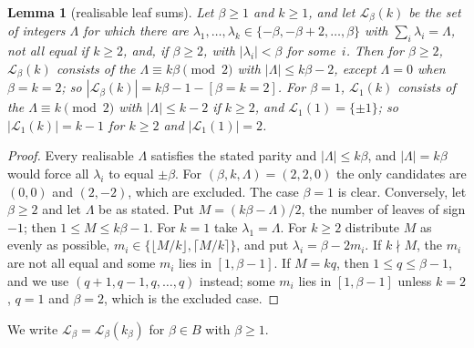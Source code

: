 \documentclass[11pt]{article}
\numberwithin{equation}{section}
\newtheorem{lemma}{Lemma}[section]
\theoremstyle{remark}
\newcommand{\cL}{\mathcal L}
\begin{document}
\begin{lemma}[realisable leaf sums]\label{lem:real}
Let $\beta\ge1$ and $k\ge1$, and let $\cL_\beta(k)$ be the set of integers
$\Lambda$ for which there are $\lambda_1,\dots,\lambda_k\in\{-\beta,-\beta+2,
\dots,\beta\}$ with $\sum_i\lambda_i=\Lambda$, not all equal if $k\ge2$, and,
if $\beta\ge2$, with $|\lambda_i|<\beta$ for some~$i$. Then for $\beta\ge2$,
$\cL_\beta(k)$ consists of the $\Lambda\equiv k\beta\pmod2$ with
$|\Lambda|\le k\beta-2$, except $\Lambda=0$ when $\beta=k=2$; so
$|\cL_\beta(k)|=k\beta-1-[\beta=k=2]$. For $\beta=1$, $\cL_1(k)$ consists of the
$\Lambda\equiv k\pmod 2$ with $|\Lambda|\le k-2$ if $k\ge2$, and
$\cL_1(1)=\{\pm1\}$; so $|\cL_1(k)|=k-1$ for $k\ge2$ and $|\cL_1(1)|=2$.
\end{lemma}
\begin{proof}
Every realisable $\Lambda$ satisfies the stated parity and $|\Lambda|\le
k\beta$, and $|\Lambda|=k\beta$ would force all $\lambda_i$ to equal $\pm\beta$.
For $(\beta,k,\Lambda)=(2,2,0)$ the only candidates are $(0,0)$ and
$(2,-2)$, which are excluded. The case $\beta=1$ is clear. Conversely, let
$\beta\ge2$ and let $\Lambda$ be as stated. Put $M=(k\beta-\Lambda)/2$, the
number of leaves of sign $-1$; then $1\le M\le k\beta-1$. For $k=1$ take
$\lambda_1=\Lambda$. For $k\ge2$ distribute $M$ as evenly as possible, $m_i\in
\{\lfloor M/k\rfloor,\lceil M/k\rceil\}$, and put $\lambda_i=\beta-2m_i$. If
$k\nmid M$, the $m_i$ are not all equal and some $m_i$ lies in $[1,\beta-1]$.
If $M=kq$, then $1\le q\le\beta-1$, and we use $(q+1,q-1,q,\dots,q)$ instead;
some $m_i$ lies in $[1,\beta-1]$ unless $k=2$, $q=1$ and $\beta=2$, which is
the excluded case.
\end{proof}

We write $\cL_\beta=\cL_\beta(k_\beta)$ for $\beta\in B$ with $\beta\ge1$.
\end{document}
